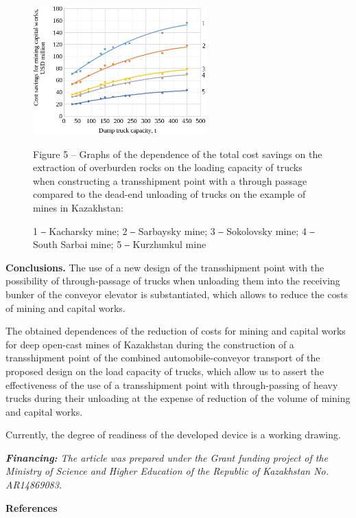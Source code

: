 \begin{figure}[H]
	\centering
	\includegraphics[width=0.6\textwidth]{assets/1363}
	\caption*{Figure 5 -- Graphs of the dependence of the total cost savings on the extraction of overburden rocks on the loading capacity of trucks when constructing a transshipment point with a through passage compared to the dead-end unloading of trucks on the example of mines in Kazakhstan:}
	\caption*{1 ‒ Kacharsky mine; 2 ‒ Sarbaysky mine; 3 ‒ Sokolovsky mine; 4 ‒ South Sarbai mine; 5 ‒ Kurzhunkul mine}
\end{figure}

\begin{multicols}{2}
{\bfseries Conclusions.} The use of a new design of the transshipment point
with the possibility of through-passage of trucks when unloading them
into the receiving bunker of the conveyor elevator is substantiated,
which allows to reduce the costs of mining and capital works.

The obtained dependences of the reduction of costs for mining and
capital works for deep open-cast mines of Kazakhstan during the
construction of a transshipment point of the combined
automobile-conveyor transport of the proposed design on the load
capacity of trucks, which allow us to assert the effectiveness of the
use of a transshipment point with through-passing of heavy trucks during
their unloading at the expense of reduction of the volume of mining and
capital works.

Currently, the degree of readiness of the developed device is a working
drawing.

\emph{{\bfseries Financing:} The article was prepared under the Grant
funding project of the Ministry of Science and Higher Education of the
Republic of Kazakhstan No. AR14869083.}
\end{multicols}

\begin{center}
{\bfseries References}
\end{center}

